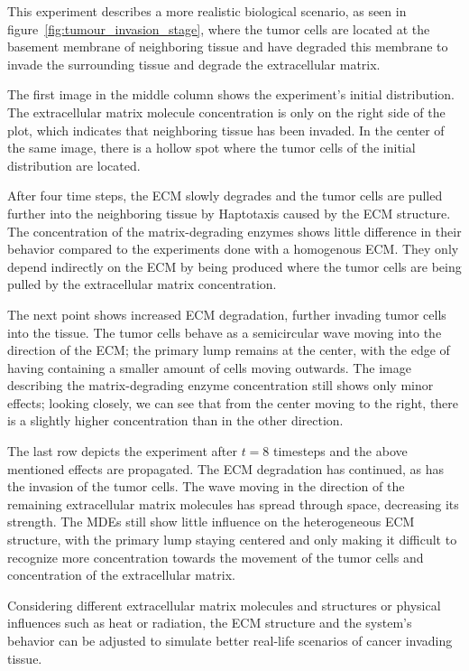 This experiment describes a more realistic biological scenario, as seen in figure~\ref{fig:tumour_invasion_stage}, where the tumor cells are located at the basement membrane of neighboring tissue and have degraded this membrane to invade the surrounding tissue and degrade the extracellular matrix.

The first image in the middle column shows the experiment's initial distribution. The extracellular matrix molecule concentration is only on the right side of the plot, which indicates that neighboring tissue has been invaded. In the center of the same image, there is a hollow spot where the tumor cells of the initial distribution are located. 

After four time steps, the ECM slowly degrades and the tumor cells are pulled further into the neighboring tissue by Haptotaxis caused by the ECM structure. The concentration of the matrix-degrading enzymes shows little difference in their behavior compared to the experiments done with a homogenous ECM. They only depend indirectly on the ECM by being produced where the tumor cells are being pulled by the extracellular matrix concentration. 

The next point shows increased ECM degradation, further invading tumor cells into the tissue. The tumor cells behave as a semicircular wave moving into the direction of the ECM; the primary lump remains at the center, with the edge of having containing a smaller amount of cells moving outwards. The image describing the matrix-degrading enzyme concentration still shows only minor effects; looking closely, we can see that from the center moving to the right, there is a slightly higher concentration than in the other direction.

The last row depicts the experiment after $t=8$ timesteps and the above mentioned effects are propagated. The ECM degradation has continued, as has the invasion of the tumor cells. The wave moving in the direction of the remaining extracellular matrix molecules has spread through space, decreasing its strength. The MDEs still show little influence on the heterogeneous ECM structure, with the primary lump staying centered and only making it difficult to recognize more concentration towards the movement of the tumor cells and concentration of the extracellular matrix.
 
Considering different extracellular matrix molecules and structures or physical influences such as heat or radiation, the ECM structure and the system's behavior can be adjusted to simulate better real-life scenarios of cancer invading tissue.
